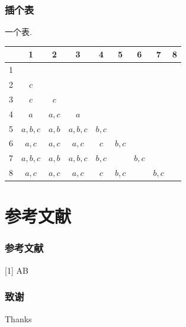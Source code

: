 \documentclass{beamer}
\begin{document}
\begin{CJK}{UTF8}{gbsn}
	\begin{frame}\frametitle{插个表}
	一个表.
	 \begin{table}
	  \centering \addtolength{\tabcolsep}{1mm}
	 \begin{tabular}{ccccccccc}
	   \hline
	        & 1 & 2 & 3 & 4 & 5 & 6 & 7 & 8 \\
	   \hline
	    1 &         &       &          &       &       &       &       &  \\
	    2 & $c$     &       &          &       &       &       &       &  \\
	    3 & $c$     & $c $  &          &       &       &       &       &  \\
	    4 & $a$     & $a,c$ & $a $     &       &       &       &       &  \\
		5 & $a,b,c$ & $a,b$ & $a,b,c$  & $b,c$ &       &       &       &  \\
   		6 & $a,c$   & $a,c$ & $a,c$    & $c $  & $b,c$ &       &       &  \\
   		7 & $a,b,c$ & $a,b$ & $a,b,c$  & $b,c$ &       & $b,c$ &       &  \\
   		8 & $a,c$   & $a,c$ & $a,c$    & $c$   & $b,c$ &       & $b,c$ &  \\
   		\hline
		\end{tabular}\label{dismatrix}
		\end{table}
		\end{frame}

	\section{参考文献}
	\begin{frame}\frametitle{参考文献}
		[1] A\newline
		[2] B
	\end{frame}


	\begin{frame}\frametitle{致谢}
		Thanks
	\end{frame}


\end{CJK}
\end{document}
